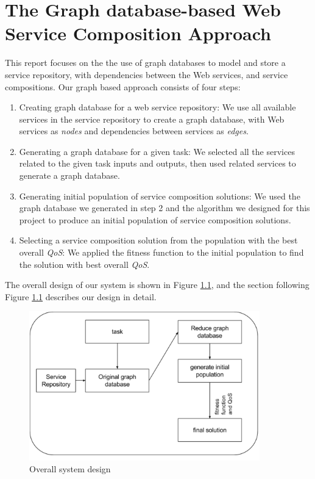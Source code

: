 \chapter{The Graph database-based Web Service Composition Approach}\label{C:wd}
This report focuses on the the use of graph databases to model and store a service repository, with dependencies between the Web services, and service compositions. Our graph based approach consists of four steps:\par
\begin{enumerate}
  \item Creating graph database for a web service repository: We use all available services in the service repository to create a graph database, with Web services as \emph{nodes} and dependencies between services as \emph{edges}.\par

  \item Generating a graph database for a given task: We selected all the services related to the given task inputs and outputs, then used related services to generate a graph database.\par

  \item Generating initial population of service composition solutions: We used the graph database we generated in step 2 and the algorithm we designed for this project to produce an initial population of service composition solutions.\par

  \item Selecting a service composition solution from the population with the best overall \emph{QoS}: We applied the fitness function to the initial population to find the solution with best overall \emph{QoS}.\par

\end{enumerate}
The overall design of our system is shown in Figure \ref{fig:process}, and the section following Figure \ref{fig:process} describes our design in detail.\par

\begin{figure}[H]
\includegraphics[width=10cm]{process.pdf}
\centering
\caption{Overall system design}
\label{fig:process} 
\end{figure} 

